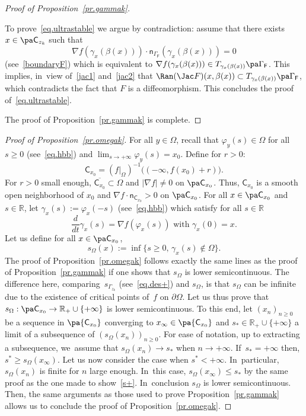 \begin{proof}[Proof of Proposition~\ref{pr.gammak}]
\begin{enumerate}
To prove~\eqref{eq.ultrastable} we argue by contradiction: assume that there exists $x\in \pa \mathsf C_{z
_k}$ such that
\[
\nabla f(\gamma_x(\beta(x)))\cdot \mathsf n_{
\Gamma_{\mathsf F} }(\gamma_x(\beta(x)))=0
\]
(see~\eqref{boundaryF})
which is equivalent to $\nabla f(\gamma_x(\beta(x)))\in T_{\gamma_x(\beta(x))} \pa \Gamma_{\mathsf F}$. This implies, in~view of~\eqref{jac1} and~\eqref{jac2} that $\Ran (\Jac F) (x,\beta(x))\subset T_{\gamma_x(\beta(x))} \pa \Gamma_{\mathsf F}$, which contradicts the fact that $F$ is a diffeomorphism. This concludes the proof of~\eqref{eq.ultrastable}.
\end{enumerate}
The proof of Proposition~\ref{pr.gammak} is complete. \end{proof}

\begin{proof}[Proof of Proposition~\ref{pr.omegak}]
For all $y\in \Omega$, recall that $\varphi_y(s)\in \Omega$ for all $s\ge 0$ (see~\eqref{eq.hbb}) and $\lim_{s\to +\infty}\varphi_y(s)=x_0$.
Define for $r>0$:
\[
\mathsf C_{x_0} =(f|_{\Omega})^{-1}\bigl((-\infty, f(x_0)+r)\bigr).
\]
For $r>0$ small enough, $\overline{\mathsf C_{x_0}} \subset \Omega$ and $\vert \nabla f\vert \neq 0$ on $\pa \mathsf C_{x_0}$. Thus, ${\mathsf C_{x_0}}$ is a smooth open neighborhood of $x_0$ and $\nabla f \cdot \mathsf n_{\mathsf C_{x_0}}>0$ on $\pa \mathsf C_{x_0}$.
For all $x\in \pa \mathsf C_{x_0}$ and $s\in \mathbb R$, let $\gamma_x(s):=\varphi_x(-s)$ (see~\eqref{eq.hbb}) which satisfy for all $s\in \mathbb R$
\[
\frac{d}{dt}\gamma_x(s)=\nabla f(\varphi_x(s)) \text{ with } \gamma_x(0)=x.
\]
Let us define
for all $x\in \pa \mathsf C_{x_0}$,
\[
s_{\Omega}(x):=\inf\{s\ge 0, \, \gamma_x(s) \notin\Omega \}.
\]
The proof of Proposition~\ref{pr.omegak} follows exactly the same lines as the proof of Proposition~\ref{pr.gammak} if one shows that $ s_\Omega$ is lower semicontinuous. The difference here, comparing~$ s_{\Gamma_{z_k}}$ (see~\eqref{eq.des+}) and $ s_{\Omega}$, is that $ s_{\Omega}$ can be infinite due to the existence of critical points of~$f$ on $\partial \Omega$. Let us thus prove that $ s_\Omega: \pa \mathsf C_{x_0}\to \mathbb R_+\cup \{+\infty\}$ is lower semicontinuous. To this end, let $(x_n)_{n\ge 0}$ be a sequence in $ \pa { \mathsf C_{x_0}}$ converging to $x_\infty\in \pa { \mathsf C_{x_0}}$ and $s_*\in {\mathbb R_+}\cup \{+\infty\}$ a limit of a subsequence of $(s_\Omega(x_n))_{n\ge 0}$. For ease of notation, up to extracting a subsequence, we~assume that $ s_\Omega(x_n)\to s_*$ when $n\to +\infty$. If~$s_*=+\infty$ then, $s^*\ge s_\Omega(x_\infty)$. Let us now consider the case when $s^*<+\infty$. In~particular, $ s_\Omega(x_n)$ is finite for $n$ large enough. In~this case, $s_\Omega(x_\infty)\le s_*$ by the same proof as the one made to show~\eqref{s+}. In~conclusion $s_\Omega$ is lower semicontinuous. Then, the same arguments as those used to prove Proposition~\ref{pr.gammak} allows us to conclude the proof of Proposition~\ref{pr.omegak}.
\end{proof}

